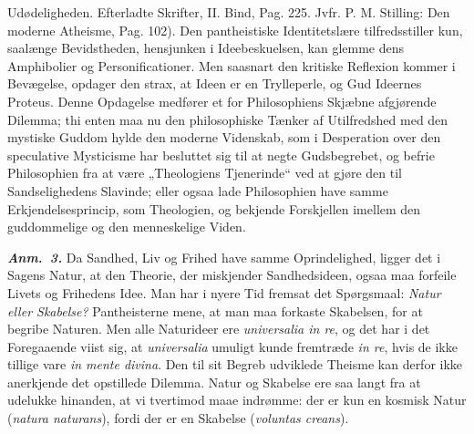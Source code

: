\documentclass[12pt]{book}
\newcommand{\anm}[1]{\emph{\textbf{Anm.~#1.}}}
\newcommand{\opage}[1]{\marginnote{\footnotesize\textit{[#1]}}}
\begin{document}
Udødeligheden. Efterladte Skrifter, II. Bind, Pag. 225. Jvfr. P. M. Stilling: Den
moderne Atheisme, Pag. 102).
\opage{280} %
Den pantheistiske Identitetslære tilfredsstiller kun, saalænge Bevidstheden, hensjunken
i Ideebeskuelsen, kan glemme dens Amphibolier og Personificationer. Men saasnart den
kritiske Reflexion kommer i Bevægelse, opdager den strax, at Ideen er en Trylleperle, og
Gud Ideernes Proteus. Denne Opdagelse medfører et for Philosophiens Skjæbne afgjørende
Dilemma; thi enten maa nu den philosophiske Tænker af Utilfredshed med den mystiske
Guddom hylde den moderne Videnskab, som i Desperation over den speculative Mysticisme
har besluttet sig til at negte Gudsbegrebet, og befrie Philosophien fra at være
„Theologiens Tjenerinde“ ved at gjøre den til Sandselighedens Slavinde; eller ogsaa lade
Philosophien have samme Erkjendelsesprincip, som Theologien, og bekjende Forskjellen
imellem den guddommelige og den menneskelige Viden.

\anm{3} Da Sandhed, Liv og Frihed have samme Oprindelighed, ligger det i Sagens Natur,
at den Theorie, der miskjender Sandhedsideen, ogsaa maa forfeile Livets og Frihedens
Idee. Man har i nyere Tid fremsat det Spørgsmaal: \emph{Natur eller Skabelse?}
Pantheisterne mene, at man maa forkaste Skabelsen, for at begribe Naturen. Men alle
Naturideer ere \textit{universalia in re}, og det har i det Foregaaende viist sig, at
\textit{universalia} umuligt kunde fremtræde \textit{in re}, hvis de ikke tillige vare
\textit{in mente divina}. Den til sit Begreb udviklede Theisme kan derfor ikke
anerkjende det opstillede Dilemma. Natur og Skabelse ere saa langt fra at udelukke
hinanden, at vi tvertimod maae indrømme: der er kun en kosmisk Natur (\textit{natura
naturans}), fordi der er en Skabelse (\textit{voluntas creans}).
\end{document}
